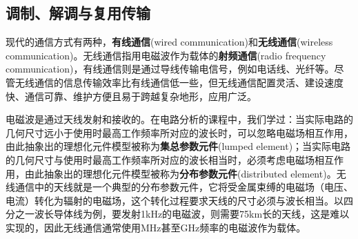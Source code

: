 \subsection{调制、解调与复用传输}\label{sub:modulation}

现代的通信方式有两种\cite{electronic_circuits}，\textbf{有线通信}(wired communication)和\textbf{无线通信}(wireless communication)。无线通信指用电磁波作为载体的\textbf{射频通信}(radio frequency communication)，有线通信则是通过导线传输电信号，例如电话线、光纤等。尽管无线通信的信息传输效率比有线通信低一些，但无线通信配置灵活、建设速度快、通信可靠、维护方便且易于跨越复杂地形，应用广泛。

电磁波是通过天线发射和接收的。在电路分析的课程中，我们学过：当实际电路的几何尺寸远小于使用时最高工作频率所对应的波长时，可以忽略电磁场相互作用，由此抽象出的理想化元件模型被称为\textbf{集总参数元件}(lumped element)；当实际电路的几何尺寸与使用时最高工作频率所对应的波长相当时，必须考虑电磁场相互作用，由此抽象出的理想化元件模型被称为\textbf{分布参数元件}(distributed element)。无线通信中的天线就是一个典型的分布参数元件，它将受金属束缚的电磁场（电压、电流）转化为辐射的电磁场，这个转化过程要求天线的尺寸必须与波长相当。以四分之一波长导体线为例，要发射1kHz的电磁波，则需要75km长的天线，这是难以实现的，因此无线通信通常使用MHz甚至GHz频率的电磁波作为载体。

